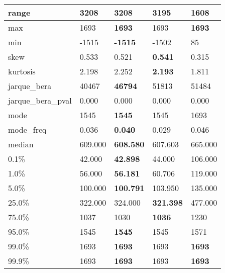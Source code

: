 \begin{table}[H]
\begin{tabular}{|l|m{10em}|m{10em}|m{10em}|m{10em}|}
\hline range & 3208 & \bfseries 3208 & 3195 & \cellcolor[rgb]{0.9, 0.54, 0.52} 1608 \\
\hline max & 1693 & \bfseries 1693 & \cellcolor[rgb]{0.9, 0.54, 0.52} 1693 & \bfseries 1693 \\
\hline min & -1515 & \bfseries -1515 & -1502 & \cellcolor[rgb]{0.9, 0.54, 0.52} 85 \\
\hline skew & 0.533 & 0.521 & \bfseries 0.541 & \cellcolor[rgb]{0.9, 0.54, 0.52} 0.315 \\
\hline kurtosis & 2.198 & 2.252 & \bfseries 2.193 & \cellcolor[rgb]{0.9, 0.54, 0.52} 1.811 \\
\hline jarque\_bera & 40467 & \bfseries 46794 & \cellcolor[rgb]{0.9, 0.54, 0.52} 51813 & 51484 \\
\hline jarque\_bera\_pval & 0.000 & 0.000 & 0.000 & 0.000 \\
\hline mode & 1545 & \bfseries 1545 & 1545 & \cellcolor[rgb]{0.9, 0.54, 0.52} 1693 \\
\hline mode\_freq & 0.036 & \bfseries 0.040 & 0.029 & \cellcolor[rgb]{0.9, 0.54, 0.52} 0.046 \\
\hline median & 609.000 & \bfseries 608.580 & 607.603 & \cellcolor[rgb]{0.9, 0.54, 0.52} 665.000 \\
\hline 0.1\% & 42.000 & \bfseries 42.898 & 44.000 & \cellcolor[rgb]{0.9, 0.54, 0.52} 106.000 \\
\hline 1.0\% & 56.000 & \bfseries 56.181 & 60.706 & \cellcolor[rgb]{0.9, 0.54, 0.52} 119.000 \\
\hline 5.0\% & 100.000 & \bfseries 100.791 & 103.950 & \cellcolor[rgb]{0.9, 0.54, 0.52} 135.000 \\
\hline 25.0\% & 322.000 & 324.000 & \bfseries 321.398 & \cellcolor[rgb]{0.9, 0.54, 0.52} 477.000 \\
\hline 75.0\% & 1037 & 1030 & \bfseries 1036 & \cellcolor[rgb]{0.9, 0.54, 0.52} 1230 \\
\hline 95.0\% & 1545 & \bfseries 1545 & 1545 & \cellcolor[rgb]{0.9, 0.54, 0.52} 1571 \\
\hline 99.0\% & 1693 & \bfseries 1693 & \cellcolor[rgb]{0.9, 0.54, 0.52} 1693 & \bfseries 1693 \\
\hline 99.9\% & 1693 & \bfseries 1693 & \cellcolor[rgb]{0.9, 0.54, 0.52} 1693 & \bfseries 1693 \\
\hline
\end{tabular}
\end{table}
